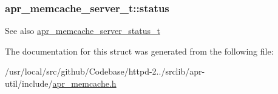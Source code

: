 \subsubsection[{\texorpdfstring{status}{status}}]{ apr\+\_\+memcache\+\_\+server\+\_\+t\+::status}\hypertarget{structapr__memcache__server__t_a641c9cd95499a998ba2717ec5f03b174}{}\label{structapr__memcache__server__t_a641c9cd95499a998ba2717ec5f03b174}
\begin{DoxySeeAlso}{See also}
\hyperlink{group__APR__Util__MC_ga3b18c7c3f0ecabb930b78aa549c2e2e8}{apr\+\_\+memcache\+\_\+server\+\_\+status\+\_\+t} 
\end{DoxySeeAlso}


The documentation for this struct was generated from the following file\+:\begin{DoxyCompactItemize}
\item 
/usr/local/src/github/\+Codebase/httpd-\/2../srclib/apr-\/util/include/\hyperlink{apr__memcache_8h}{apr\+\_\+memcache.\+h}\end{DoxyCompactItemize}
